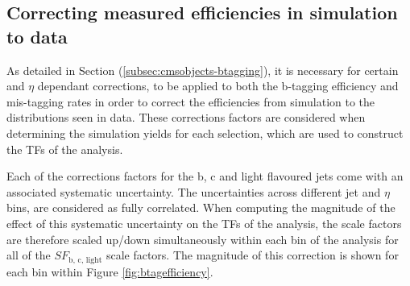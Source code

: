 \subsection{Correcting measured efficiencies in simulation to data}
\label{subsec:formulamethodsf}

As detailed in Section (\ref{subsec:cmsobjects-btagging}), it is necessary for certain \pt and $\eta$ dependant corrections, to be applied to both the b-tagging efficiency and mis-tagging rates in order to correct the efficiencies from simulation to the distributions seen in data. These corrections factors are considered when determining the simulation yields for each selection, which are used to construct the \ac{TF}s of the analysis. 

Each of the corrections factors for the b, c and light flavoured jets come with an associated systematic uncertainty. The uncertainties across different jet \pt and $\eta$ bins, are considered as fully correlated. When computing the magnitude of the effect of this systematic uncertainty on the \ac{TF}s of the analysis, the scale factors are therefore scaled up/down simultaneously within each \theht bin of the analysis for all of the $SF_{\text{b, c, light}}$ scale factors. The magnitude of this correction is shown for each \theht bin within Figure \ref{fig:btagefficiency}. 

